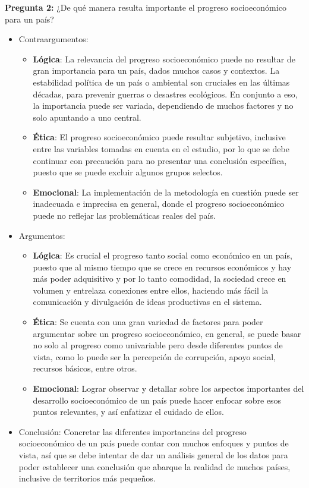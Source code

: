 \newpage
\textbf{Pregunta 2:} ¿De qué manera resulta importante el progreso socioeconómico para un país?
\begin{itemize}
    \item Contraargumentos: 
    \begin{itemize}
        \item \textbf{Lógica}: La relevancia del progreso socioeconómico puede no resultar de gran importancia para un país, dados muchos casos y contextos. La estabilidad política de un país o ambiental son cruciales en las últimas décadas, para prevenir guerras o desastres ecológicos. En conjunto a eso, la importancia puede ser variada, dependiendo de muchos factores y no solo apuntando a uno central.  
        \item \textbf{Ética}: El progreso socioeconómico puede resultar subjetivo, inclusive entre las variables tomadas en cuenta en el estudio, por lo que se debe continuar con precaución para no presentar una conclusión específica, puesto que se puede excluir algunos grupos selectos.
        \item \textbf{Emocional}: La implementación de la metodología en cuestión puede ser inadecuada e imprecisa en general, donde el progreso socioeconómico puede no reflejar las problemáticas reales del país.
    \end{itemize}
    \item Argumentos:
    \begin{itemize}
        \item \textbf{Lógica}: Es crucial el progreso tanto social como económico en un país, puesto que al mismo tiempo que se crece en recursos económicos y hay más poder adquisitivo y por lo tanto comodidad, la sociedad crece en volumen y entrelaza conexiones entre ellos, haciendo más fácil la comunicación y divulgación de ideas productivas en el sistema. 
        \item \textbf{Ética}: Se cuenta con una gran variedad de factores para poder argumentar sobre un progreso socioeconómico, en general, se puede basar no solo al progreso como univariable pero desde diferentes puntos de vista, como lo puede ser la percepción de corrupción, apoyo social, recursos básicos, entre otros.
        \item \textbf{Emocional}: Lograr observar y detallar sobre los aspectos importantes del desarrollo socioeconómico de un país puede hacer enfocar sobre esos puntos relevantes, y así enfatizar el cuidado de ellos.
    \end{itemize}
    \item Conclusión: Concretar las diferentes importancias del progreso socioeconómico de un país puede contar con muchos enfoques y puntos de vista, así que se debe intentar de dar un análisis general de los datos para poder establecer una conclusión que abarque la realidad de muchos países, inclusive de territorios más pequeños.
\end{itemize}

